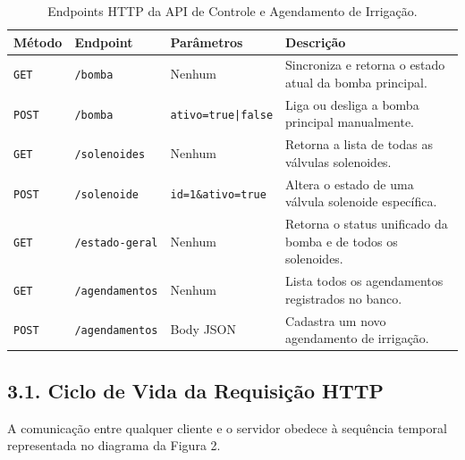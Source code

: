 \begin{table}[h!]
\centering
\fontsize{10}{12}\selectfont
\caption{Endpoints HTTP da API de Controle e Agendamento de Irrigação.}
\begin{tabular}{|l|l|l|p{5.5cm}|}
\hline
\textbf{Método} & \textbf{Endpoint} & \textbf{Parâmetros} & \textbf{Descrição} \\ \hline
\texttt{GET} & \texttt{/bomba} & Nenhum & Sincroniza e retorna o estado atual da bomba principal. \\ \hline
\texttt{POST} & \texttt{/bomba} & \texttt{ativo=true|false} & Liga ou desliga a bomba principal manualmente. \\ \hline
\texttt{GET} & \texttt{/solenoides} & Nenhum & Retorna a lista de todas as válvulas solenoides. \\ \hline
\texttt{POST} & \texttt{/solenoide} & \texttt{id=1\&ativo=true} & Altera o estado de uma válvula solenoide específica. \\ \hline
\texttt{GET} & \texttt{/estado-geral} & Nenhum & Retorna o status unificado da bomba e de todos os solenoides. \\ \hline
\texttt{GET} & \texttt{/agendamentos} & Nenhum & Lista todos os agendamentos registrados no banco. \\ \hline
\texttt{POST} & \texttt{/agendamentos} & Body JSON & Cadastra um novo agendamento de irrigação. \\ \hline
\end{tabular}
\end{table}

\subsection*{3.1. Ciclo de Vida da Requisição HTTP}

A comunicação entre qualquer cliente e o servidor obedece à sequência temporal representada no diagrama da Figura 2.

\vspace{1em}


